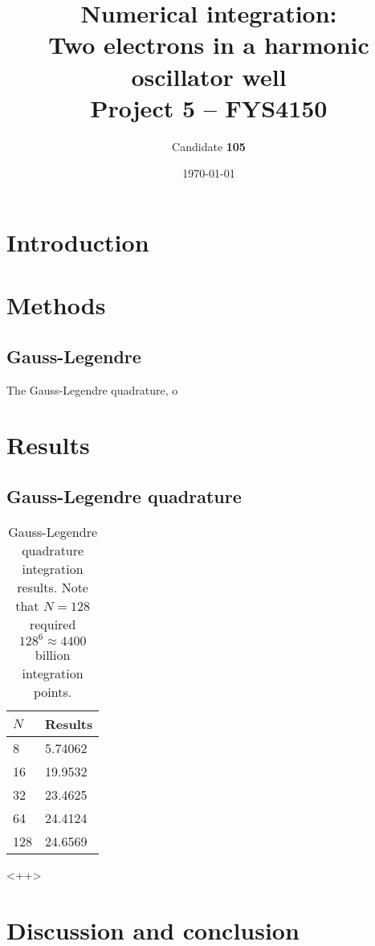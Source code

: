 \documentclass[a4paper,11pt]{article}
\date{\today}
\title{Numerical integration:\\ Two electrons in a harmonic oscillator well\\ \small{Project 5 -- FYS4150}}
\author{Candidate \textbf{105}}
\begin{document}
\onecolumn
\maketitle{}

\begin{abstract}
\end{abstract}

\section{Introduction}


\section{Methods}
\subsection{Gauss-Legendre}
The Gauss-Legendre quadrature, o


\section{Results}
\subsection{Gauss-Legendre quadrature}

\begin{table}
    \centering
    \caption{Gauss-Legendre quadrature integration results. Note that $N=128$ required $128^6 \approx 4400$ billion integration points.}
    \begin{tabular}{l l}
        \hline
        $N$ &   Results \\
        \hline
        8   &   5.74062 \\
        16  &   19.9532 \\
        32  &   23.4625 \\
        64  &   24.4124 \\
        128 &   24.6569 \\
        \hline
    \end{tabular}
    \label{tab:<+label+>}
\end{table}<++>


\section{Discussion and conclusion}



\end{document}
